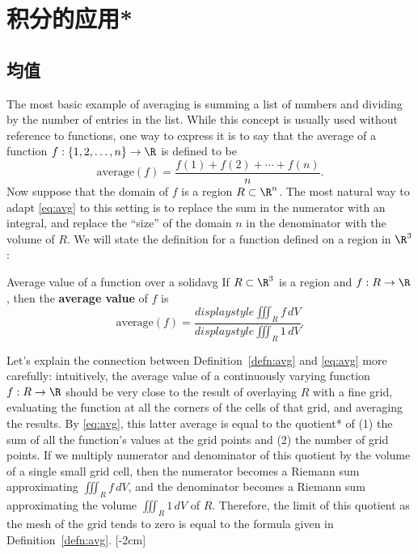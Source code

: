 \documentclass[indent]{watsonbook}
\begin{document}
{\section{积分的应用*} \label{sec:applications}

\subsection{均值}

The most basic example of averaging is summing a list of numbers and
dividing by the number of entries in the list. While this concept is
usually used without reference to functions, one way to express it is
to say that the average of a function
$f:\{1,2,\ldots,n\} \rightarrow \R$ is defined to be
\begin{equation} \label{eq:avg}
  \mathrm{average}(f) = \frac{f(1) + f(2) + \cdots + f(n)}{n}.
\end{equation}
Now suppose that the domain of $f$ is a region $R\subset \R^n$. The
most natural way to adapt \eqref{eq:avg} to this setting is to replace
the sum in the numerator with an integral, and replace the ``size'' of
the domain $n$ in the denominator with the volume of $R$. We will
state the definition for a function defined on a region in $\R^3$:

\begin{defn}{Average value of a function over a solid}{avg}
  If $R\subset \R^3$ is a region and $f: R \to \R$, then the \textbf{average value} of $f$ is
  \[
    \mathrm{average}(f) = \frac{{d}isplaystyle{\iiint_R f \,
        dV}}{{d}isplaystyle{\iiint_R 1 \, dV}}.
  \]
\end{defn}

Let's explain the connection between Definition~\ref{defn:avg} and
\eqref{eq:avg} more carefully: intuitively, the average value of a
continuously varying function $f:R\to \R$ should be very close to the
result of overlaying $R$ with a fine grid, evaluating the function at
all the corners of the cells of that grid, and averaging the
results. By \eqref{eq:avg}, this latter average is equal to the
quotient* of (1) the sum of all the function's values at the grid
points and (2) the number of grid points. If we multiply numerator and
denominator of this quotient by the volume of a single small grid
cell, then the numerator becomes a Riemann sum approximating
$\iiint_R f \, dV$, and the denominator becomes a Riemann sum
approximating the volume $\iiint_R 1 \, dV$ of $R$. Therefore, the
limit of this quotient as the mesh of the grid tends to zero is equal
to the formula given in Definition~\ref{defn:avg}. [-2cm]

}
\end{document}
